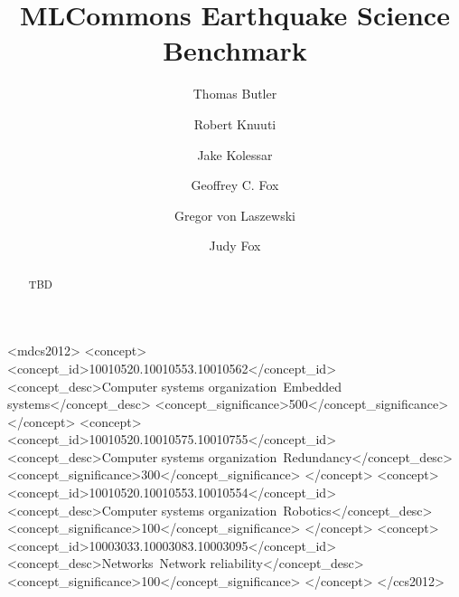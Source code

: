 \documentclass[sigplan,screen]{acmart}
\begin{document}
\title{MLCommons Earthquake Science Benchmark}

\author{Thomas Butler}

\author{Robert Knuuti}

\author{Jake Kolessar}

\author{Geoffrey C. Fox}

\author{Gregor von Laszewski}

\author{Judy Fox}

\renewcommand{\shortauthors}{Butler, Knuuti, Kolesar, G Fox, G von Laszewski}

\begin{abstract}
TBD
\end{abstract}



\begin{CCSXML}
<mdcs2012>
 <concept>
  <concept_id>10010520.10010553.10010562</concept_id>
  <concept_desc>Computer systems organization~Embedded systems</concept_desc>
  <concept_significance>500</concept_significance>
 </concept>
 <concept>
  <concept_id>10010520.10010575.10010755</concept_id>
  <concept_desc>Computer systems organization~Redundancy</concept_desc>
  <concept_significance>300</concept_significance>
 </concept>
 <concept>
  <concept_id>10010520.10010553.10010554</concept_id>
  <concept_desc>Computer systems organization~Robotics</concept_desc>
  <concept_significance>100</concept_significance>
 </concept>
 <concept>
  <concept_id>10003033.10003083.10003095</concept_id>
  <concept_desc>Networks~Network reliability</concept_desc>
  <concept_significance>100</concept_significance>
 </concept>
</ccs2012>
\end{CCSXML}
\end{document}
